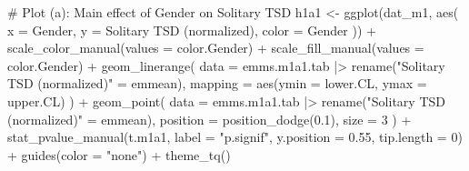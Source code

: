 \documentclass[
  bookmarksnumbered]{article}
\newenvironment{Shaded}{\begin{snugshade}}{\end{snugshade}}
\newcommand{\AttributeTok}[1]{\textcolor[rgb]{0.80,0.80,0.80}{#1}}
\newcommand{\CommentTok}[1]{\textcolor[rgb]{0.50,0.62,0.50}{#1}}
\newcommand{\DecValTok}[1]{\textcolor[rgb]{0.86,0.86,0.80}{#1}}
\newcommand{\FloatTok}[1]{\textcolor[rgb]{0.75,0.75,0.82}{#1}}
\newcommand{\FunctionTok}[1]{\textcolor[rgb]{0.94,0.94,0.56}{#1}}
\newcommand{\NormalTok}[1]{\textcolor[rgb]{0.80,0.80,0.80}{#1}}
\newcommand{\OtherTok}[1]{\textcolor[rgb]{0.94,0.94,0.56}{#1}}
\newcommand{\SpecialCharTok}[1]{\textcolor[rgb]{0.86,0.64,0.64}{#1}}
\newcommand{\StringTok}[1]{\textcolor[rgb]{0.80,0.58,0.58}{#1}}
\begin{document}
\begin{Shaded}
\begin{Highlighting}[]
\CommentTok{\# Plot (a): Main effect of Gender on Solitary TSD}
\NormalTok{h1a1 }\OtherTok{\textless{}{-}} \FunctionTok{ggplot}\NormalTok{(dat\_m1, }\FunctionTok{aes}\NormalTok{(}
  \AttributeTok{x =}\NormalTok{ Gender, }\AttributeTok{y =} \StringTok{\textasciigrave{}}\AttributeTok{Solitary TSD (normalized)}\StringTok{\textasciigrave{}}\NormalTok{, }\AttributeTok{color =}\NormalTok{ Gender}
\NormalTok{)) }\SpecialCharTok{+}
  \FunctionTok{scale\_color\_manual}\NormalTok{(}\AttributeTok{values =}\NormalTok{ color.Gender) }\SpecialCharTok{+}
  \FunctionTok{scale\_fill\_manual}\NormalTok{(}\AttributeTok{values =}\NormalTok{ color.Gender) }\SpecialCharTok{+}
  \FunctionTok{geom\_linerange}\NormalTok{(}
    \AttributeTok{data =}\NormalTok{ emms.m1a1.tab }\SpecialCharTok{|\textgreater{}} \FunctionTok{rename}\NormalTok{(}\StringTok{"Solitary TSD (normalized)"} \OtherTok{=}\NormalTok{ emmean),}
    \AttributeTok{mapping =} \FunctionTok{aes}\NormalTok{(}\AttributeTok{ymin =}\NormalTok{ lower.CL, }\AttributeTok{ymax =}\NormalTok{ upper.CL)}
\NormalTok{  ) }\SpecialCharTok{+}
  \FunctionTok{geom\_point}\NormalTok{(}
    \AttributeTok{data =}\NormalTok{ emms.m1a1.tab }\SpecialCharTok{|\textgreater{}} \FunctionTok{rename}\NormalTok{(}\StringTok{"Solitary TSD (normalized)"} \OtherTok{=}\NormalTok{ emmean),}
    \AttributeTok{position =} \FunctionTok{position\_dodge}\NormalTok{(}\FloatTok{0.1}\NormalTok{), }\AttributeTok{size =} \DecValTok{3}
\NormalTok{  ) }\SpecialCharTok{+}
  \FunctionTok{stat\_pvalue\_manual}\NormalTok{(t.m1a1, }\AttributeTok{label =} \StringTok{"p.signif"}\NormalTok{, }\AttributeTok{y.position =} \FloatTok{0.55}\NormalTok{, }\AttributeTok{tip.length =} \DecValTok{0}\NormalTok{) }\SpecialCharTok{+}
  \FunctionTok{guides}\NormalTok{(}\AttributeTok{color =} \StringTok{"none"}\NormalTok{) }\SpecialCharTok{+}
  \FunctionTok{theme\_tq}\NormalTok{()}


\end{Highlighting}
\end{Shaded}
\end{document}
